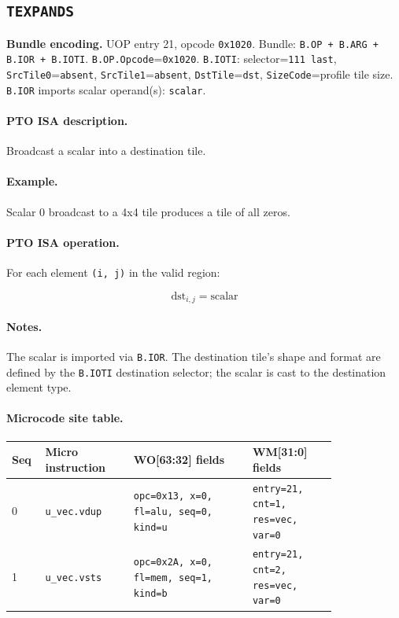 \subsection{\texttt{TEXPANDS}}
\noindent\textbf{Bundle encoding.} UOP entry 21, opcode \texttt{0x1020}. Bundle: \texttt{B.OP + B.ARG + B.IOR + B.IOTI}. \texttt{B.OP.Opcode}=\texttt{0x1020}. \texttt{B.IOTI}: selector=\texttt{111 last}, \texttt{SrcTile0}=\texttt{absent}, \texttt{SrcTile1}=\texttt{absent}, \texttt{DstTile}=\texttt{dst}, \texttt{SizeCode}=profile tile size. \texttt{B.IOR} imports scalar operand(s): \texttt{scalar}.\par\smallskip
{\small
\paragraph{PTO ISA description.}
Broadcast a scalar into a destination tile.
\paragraph{Example.}
Scalar 0 broadcast to a 4x4 tile produces a tile of all zeros.
\par\smallskip
\paragraph{PTO ISA operation.}
For each element \texttt{(i, j)} in the valid region:

\[
\mathrm{dst}_{i,j} = \mathrm{scalar}
\]
}\par\smallskip
\paragraph{Notes.}
The scalar is imported via \texttt{B.IOR}. The destination tile's shape and format are defined by the \texttt{B.IOTI} destination selector; the scalar is cast to the destination element type.
\paragraph{Microcode site table.}
{\scriptsize
\begin{longtable}{@{}R{0.055\linewidth}L{0.23\linewidth}L{0.31\linewidth}L{0.22\linewidth}@{}}
\toprule
Seq & Micro instruction & WO[63:32] fields & WM[31:0] fields \\
 & \texttt{u\_vec.vdup} & \texttt{opc=0x13, x=0, fl=alu, seq=0, kind=u} & \texttt{entry=21, cnt=1, res=vec, var=0} \\
1 & \texttt{u\_vec.vsts} & \texttt{opc=0x2A, x=0, fl=mem, seq=1, kind=b} & \texttt{entry=21, cnt=2, res=vec, var=0} \\
\bottomrule
\end{longtable}
}
